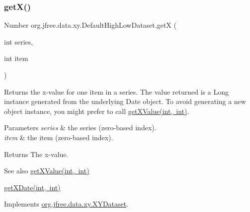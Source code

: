 \subsubsection{\texorpdfstring{get\+X()}{getX()}}
{\footnotesize\ttfamily Number org.\+jfree.\+data.\+xy.\+Default\+High\+Low\+Dataset.\+getX (\begin{DoxyParamCaption}\item[{int}]{series,  }\item[{int}]{item }\end{DoxyParamCaption})}

Returns the x-\/value for one item in a series. The value returned is a {\ttfamily Long} instance generated from the underlying {\ttfamily Date} object. To avoid generating a new object instance, you might prefer to call \mbox{\hyperlink{classorg_1_1jfree_1_1data_1_1xy_1_1_abstract_x_y_dataset_a0d74392c194073e586d8a039767c622f}{get\+X\+Value(int, int)}}.


\begin{DoxyParams}{Parameters}
{\em series} & the series (zero-\/based index). \\
\hline
{\em item} & the item (zero-\/based index).\\
\hline
\end{DoxyParams}
\begin{DoxyReturn}{Returns}
The x-\/value.
\end{DoxyReturn}
\begin{DoxySeeAlso}{See also}
\mbox{\hyperlink{classorg_1_1jfree_1_1data_1_1xy_1_1_abstract_x_y_dataset_a0d74392c194073e586d8a039767c622f}{get\+X\+Value(int, int)}} 

\mbox{\hyperlink{classorg_1_1jfree_1_1data_1_1xy_1_1_default_high_low_dataset_a143f51146939e03ed291bd0c6a9fa371}{get\+X\+Date(int, int)}} 
\end{DoxySeeAlso}


Implements \mbox{\hyperlink{interfaceorg_1_1jfree_1_1data_1_1xy_1_1_x_y_dataset_a85c75ba5b69b551e96afd29d1732ba22}{org.\+jfree.\+data.\+xy.\+X\+Y\+Dataset}}.

\mbox{\label{classorg_1_1jfree_1_1data_1_1xy_1_1_default_high_low_dataset_a143f51146939e03ed291bd0c6a9fa371}} 
